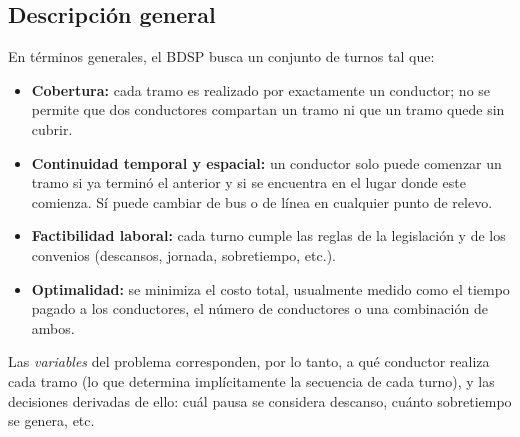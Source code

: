 \documentclass[letter, 10pt]{article}
\begin{document}
\subsection{Descripción general}
En términos generales, el BDSP busca un conjunto de turnos tal que:
\begin{itemize}
\item \textbf{Cobertura:} cada tramo es realizado por exactamente un conductor; no se permite que dos conductores compartan un tramo ni que un tramo quede sin cubrir.
\item \textbf{Continuidad temporal y espacial:} un conductor solo puede comenzar un tramo si ya terminó el anterior y si se encuentra en el lugar donde este comienza. Sí puede cambiar de bus o de línea en cualquier punto de relevo.
\item \textbf{Factibilidad laboral:} cada turno cumple las reglas de la legislación y de los convenios (descansos, jornada, sobretiempo, etc.).
\item \textbf{Optimalidad:} se minimiza el costo total, usualmente medido como el tiempo pagado a los conductores, el número de conductores o una combinación de ambos.
\end{itemize}
Las \emph{variables} del problema corresponden, por lo tanto, a qué conductor realiza cada tramo (lo que determina implícitamente la secuencia de cada turno), y las decisiones derivadas de ello: cuál pausa se considera descanso, cuánto sobretiempo se genera, etc.
\end{document}
